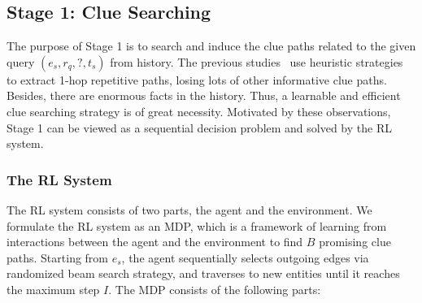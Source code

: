\documentclass[11pt,a4paper]{article}
\begin{document}
\subsection{Stage 1: Clue Searching}

The purpose of Stage 1 is to search and induce the clue paths related to the
given query $(e_{s}, r_{q}, ?, t_{s})$ from history. The previous
studies~\cite{jin2019recurrent,jin2020Renet,zhu2020learning} use heuristic
strategies to extract 1-hop repetitive paths, losing lots of other informative
clue paths. Besides, there are enormous facts in the history. Thus, a learnable
and efficient clue searching strategy is of great necessity. Motivated by these
observations, Stage 1 can be viewed as a sequential decision problem and
solved by the RL system. 
\subsubsection{The RL System}
The RL system consists of two parts, the agent and the environment. We formulate
the RL system as an MDP, which is a framework of learning from interactions
between the agent and the environment to find $B$ promising clue paths. Starting
from $e_s$, the agent sequentially selects outgoing edges via randomized beam
search strategy, and traverses to new entities until it reaches the maximum step
$I$. The MDP consists of the following parts:




\end{document}
